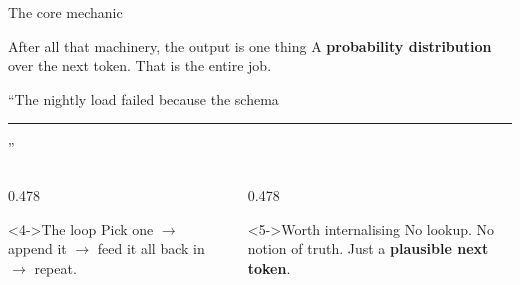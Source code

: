 \documentclass[aspectratio=169,11pt]{beamer}
\begin{document}
\begin{frame}{The core mechanic}
  \begin{block}{After all that machinery, the output is one thing}
    A \textbf{probability distribution} over the next token. That is the
    entire job.
  \end{block}
  \smallskip
  \begin{center}
  \small ``The nightly load failed because the schema \rule{8mm}{0.4pt}''
  \\[1mm]
  \end{center}
  \vspace{2mm}
  \begin{columns}[T,onlytextwidth]
    \begin{column}{0.478\textwidth}
      \begin{exampleblock}<4->{The loop}
        \small Pick one $\rightarrow$ append it $\rightarrow$ feed it all back
        in $\rightarrow$ repeat.
      \end{exampleblock}
    \end{column}
    \begin{column}{0.478\textwidth}
      \begin{alertblock}<5->{Worth internalising}
        \small No lookup. No notion of truth. Just a \textbf{plausible next
        token}.
      \end{alertblock}
    \end{column}
  \end{columns}
\end{frame}
\end{document}
